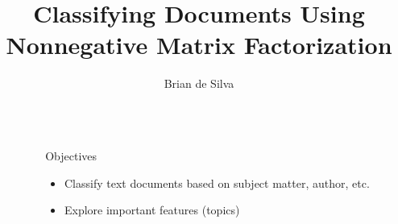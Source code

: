 \documentclass[final]{beamer}
\title{Classifying Documents Using Nonnegative Matrix Factorization} %
\author{Brian de Silva} %
\institute{Department of Applied Mathematics, University of Washington} %
\newlength{\sepwid}
\newlength{\onecolwid}
\begin{document}

\setlength{\belowcaptionskip}{2ex} %
\setlength\belowdisplayshortskip{2ex} %

\begin{frame}[t] %

\begin{columns}[t] %

\begin{column}{\sepwid}\end{column} %

\begin{column}{\onecolwid} %


\begin{alertblock}{Objectives}

\begin{itemize}
\item Classify text documents based on subject matter, author, etc.
\item Explore important features (topics)
\end{itemize}

\end{alertblock}



\end{column}
\end{columns}
\end{frame}
\end{document}

